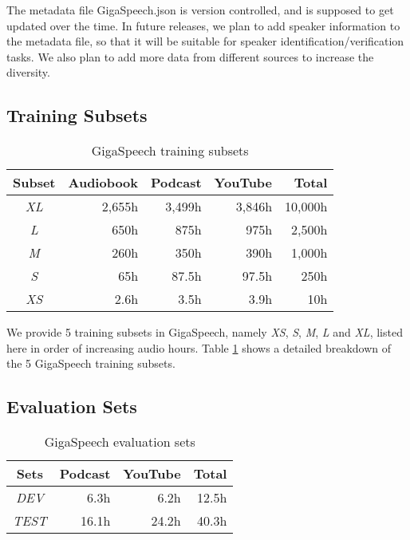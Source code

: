 \documentclass[a4paper]{article}
\begin{document}
The metadata file GigaSpeech.json is version controlled, and is supposed to get
updated over the time. In future releases, we plan to add speaker information
to the metadata file, so that it will be suitable for speaker
identification/verification tasks. We also plan to add more data from different
sources to increase the diversity.

\subsection{Training Subsets}

\begin{table}[t]
  \caption{GigaSpeech training subsets}
  \vspace{-2ex}
  \label{tab:train_subsets}
  \centering
  \begin{tabular}{c|rrr|r}
    \toprule
    \textbf{Subset} & \textbf{Audiobook} & \textbf{Podcast} & \textbf{YouTube} & \textbf{Total} \\
    \midrule
    {\it XL}         & 2,655h             & 3,499h           & 3,846h           & 10,000h \\
    {\it L}          & 650h               & 875h             & 975h             & 2,500h \\
    {\it M}          & 260h               & 350h             & 390h             & 1,000h \\
    {\it S}          & 65h                & 87.5h            & 97.5h            & 250h \\
    {\it XS}         & 2.6h               & 3.5h             & 3.9h             & 10h \\
    \bottomrule
  \end{tabular}
  \vspace{-2ex}
\end{table}

We provide 5 training subsets in GigaSpeech, namely {\it XS}, {\it S}, {\it M},
{\it L} and {\it XL}, listed here in order of increasing audio hours.
Table \ref{tab:train_subsets} shows a detailed breakdown of the 5 GigaSpeech
training subsets.

\subsection{Evaluation Sets}

\begin{table}[t]
  \caption{GigaSpeech evaluation sets}
  \vspace{-2ex}
  \label{tab:eval_sets}
  \centering
  \begin{tabular}{c|rr|r}
    \toprule
    \textbf{Sets} & \textbf{Podcast} & \textbf{YouTube} & \textbf{Total} \\
    \midrule
    {\it DEV}        & 6.3h          & 6.2h             & 12.5h \\
    {\it TEST}       & 16.1h         & 24.2h            & 40.3h \\
    \bottomrule
  \end{tabular}
\end{table}
\end{document}
